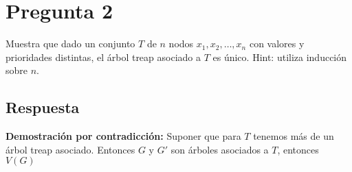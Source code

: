 \section*{Pregunta 2}
\noindent Muestra que dado un conjunto $T$ de $n$ nodos $x_1, x_2, \dots, x_n$ con valores y prioridades distintas, el árbol treap asociado a $T$ es único. Hint: utiliza inducción sobre $n$.

\subsection*{Respuesta}

\textbf{Demostración por contradicción:}
Suponer que para $T$ tenemos más de un árbol treap asociado. Entonces $G$ y $G'$ son árboles asociados a $T$, entonces $V(G)$
\bigskip

